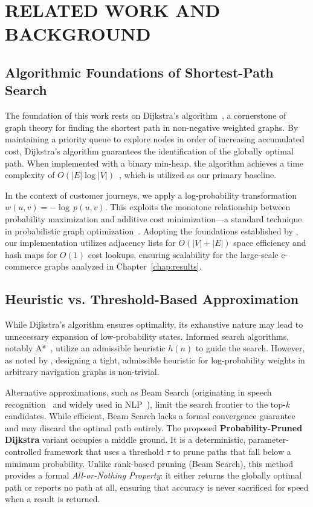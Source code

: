 \chapter{RELATED WORK AND BACKGROUND}

\section{Algorithmic Foundations of Shortest-Path Search}

The foundation of this work rests on Dijkstra's algorithm~\citep{dijkstra1959}, a cornerstone of graph theory for finding the shortest path in non-negative weighted graphs. By maintaining a priority queue to explore nodes in order of increasing accumulated cost, Dijkstra's algorithm guarantees the identification of the globally optimal path. When implemented with a binary min-heap, the algorithm achieves a time complexity of $O(|E|\log|V|)$~\citep{cormen2009}, which is utilized as our primary baseline.

In the context of customer journeys, we apply a log-probability transformation $w(u,v) = -\log\,p(u,v)$. This exploits the monotone relationship between probability maximization and additive cost minimization---a standard technique in probabilistic graph optimization~\citep{manning1999nlp}. Adopting the foundations established by \citet{cormen2009}, our implementation utilizes adjacency lists for $O(|V|+|E|)$ space efficiency and hash maps for $O(1)$ cost lookups, ensuring scalability for the large-scale e-commerce graphs analyzed in Chapter~\ref{chap:results}.

\section{Heuristic vs. Threshold-Based Approximation}

While Dijkstra's algorithm ensures optimality, its exhaustive nature may lead to unnecessary expansion of low-probability states. Informed search algorithms, notably A*~\citep{hart1968astar}, utilize an admissible heuristic $h(n)$ to guide the search. However, as noted by \citet{pearl1984heuristics}, designing a tight, admissible heuristic for log-probability weights in arbitrary navigation graphs is non-trivial.

Alternative approximations, such as Beam Search (originating in speech recognition~\citep{lowerre1976speech} and widely used in NLP~\citep{jurafsky2000speech}), limit the search frontier to the top-$k$ candidates. While efficient, Beam Search lacks a formal convergence guarantee and may discard the optimal path entirely. The proposed \textbf{Probability-Pruned Dijkstra} variant occupies a middle ground. It is a deterministic, parameter-controlled framework that uses a threshold $\tau$ to prune paths that fall below a minimum probability. Unlike rank-based pruning (Beam Search), this method provides a formal \emph{All-or-Nothing Property}: it either returns the globally optimal path or reports no path at all, ensuring that accuracy is never sacrificed for speed when a result is returned.

